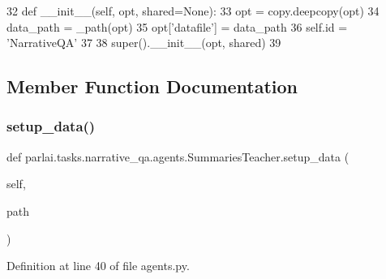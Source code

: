 \begin{DoxyCode}
32     \textcolor{keyword}{def }\_\_init\_\_(self, opt, shared=None):
33         opt = copy.deepcopy(opt)
34         data\_path = \_path(opt)
35         opt[\textcolor{stringliteral}{'datafile'}] = data\_path
36         self.id = \textcolor{stringliteral}{'NarrativeQA'}
37 
38         super().\_\_init\_\_(opt, shared)
39 
\end{DoxyCode}


\subsection{Member Function Documentation}
\mbox{\label{classparlai_1_1tasks_1_1narrative__qa_1_1agents_1_1SummariesTeacher_a76f9cadca71b61d42c5997ba590f107e}} 
\subsubsection{\texorpdfstring{setup\+\_\+data()}{setup\_data()}}
{\footnotesize\ttfamily def parlai.\+tasks.\+narrative\+\_\+qa.\+agents.\+Summaries\+Teacher.\+setup\+\_\+data (\begin{DoxyParamCaption}\item[{}]{self,  }\item[{}]{path }\end{DoxyParamCaption})}



Definition at line 40 of file agents.\+py.


